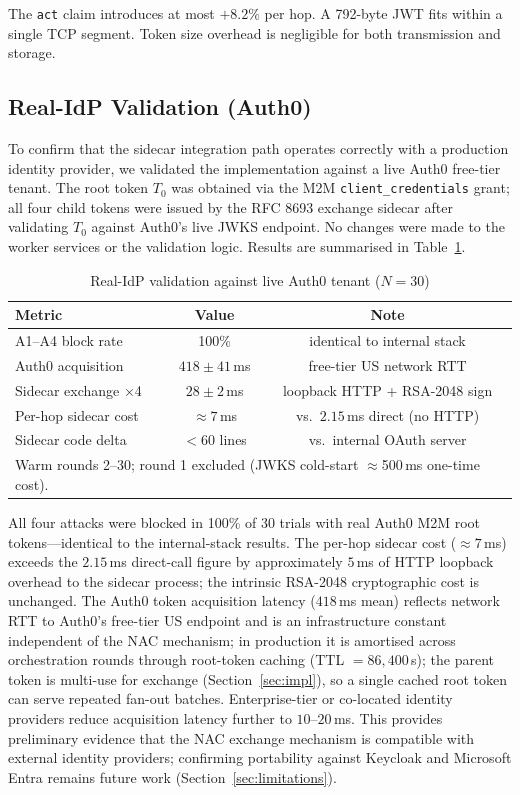 \documentclass[journal]{IEEEtran}
\theoremstyle{definition}
\begin{document}
The \texttt{act} claim introduces at most $+8.2\%$ per hop. A 792-byte JWT
fits within a single TCP segment. Token size overhead is negligible for both
transmission and storage.


\subsection{Real-IdP Validation (Auth0)}
\label{sec:auth0_validation}

To confirm that the sidecar integration path operates correctly with a
production identity provider, we validated the implementation against a live
Auth0 free-tier tenant. The root token $T_0$ was obtained via the M2M
\texttt{client\_credentials} grant; all four child tokens were issued by the
RFC 8693 exchange sidecar after validating $T_0$ against Auth0's live JWKS
endpoint. No changes were made to the worker services or the validation logic.
Results are summarised in Table~\ref{tab:auth0}.

\begin{table}[h]
\caption{Real-IdP validation against live Auth0 tenant ($N=30$)}
\label{tab:auth0}
\centering
\footnotesize
\setlength{\tabcolsep}{4pt}
\begin{tabular}{lcc}
\toprule
\textbf{Metric} & \textbf{Value} & \textbf{Note} \\
\midrule
A1--A4 block rate    & 100\%              & identical to internal stack \\
Auth0 acquisition    & $418 \pm 41$\,ms   & free-tier US network RTT \\
Sidecar exchange ×4  & $28 \pm 2$\,ms     & loopback HTTP + RSA-2048 sign \\
Per-hop sidecar cost & $\approx 7$\,ms    & vs.\ $2.15$\,ms direct (no HTTP) \\
Sidecar code delta   & $<60$ lines        & vs.\ internal OAuth server \\
\bottomrule
\multicolumn{3}{l}{\scriptsize Warm rounds 2--30; round 1 excluded (JWKS cold-start
  $\approx$500\,ms one-time cost).}
\end{tabular}
\end{table}

All four attacks were blocked in 100\% of 30 trials with real Auth0 M2M root
tokens---identical to the internal-stack results. The per-hop sidecar cost
($\approx 7$\,ms) exceeds the $2.15$\,ms direct-call figure by approximately
$5$\,ms of HTTP loopback overhead to the sidecar process; the intrinsic
RSA-2048 cryptographic cost is unchanged. The Auth0 token acquisition latency
($418$\,ms mean) reflects network RTT to Auth0's free-tier US endpoint and is
an infrastructure constant independent of the NAC mechanism; in production it is
amortised across orchestration rounds through root-token caching (TTL
$=86{,}400$\,s); the parent token is multi-use for exchange
(Section~\ref{sec:impl}), so a single cached root token can serve repeated
fan-out batches.  Enterprise-tier or co-located identity providers reduce
acquisition latency further to $10$--$20$\,ms. This provides preliminary evidence that the NAC exchange mechanism is
compatible with external identity providers; confirming portability against
Keycloak and Microsoft Entra remains future work
(Section~\ref{sec:limitations}).
\end{document}
